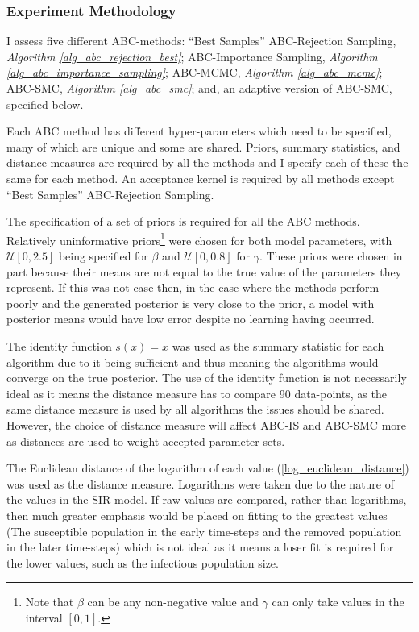 \documentclass[11pt,a4paper]{article}
\theoremstyle{break}
\begin{document}
\subsubsection*{Experiment Methodology}

  \par I assess five different ABC-methods: ``Best Samples'' ABC-Rejection Sampling, \textit{Algorithm \ref{alg_abc_rejection_best}}; ABC-Importance Sampling, \textit{Algorithm \ref{alg_abc_importance_sampling}}; ABC-MCMC, \textit{Algorithm \ref{alg_abc_mcmc}}; ABC-SMC, \textit{Algorithm \ref{alg_abc_smc}}; and, an adaptive version of ABC-SMC, specified below.

  \par Each ABC method has different hyper-parameters which need to be specified, many of which are unique and some are shared. Priors, summary statistics, and distance measures are required by all the methods and I specify each of these the same for each method. An acceptance kernel is required by all methods except ``Best Samples'' ABC-Rejection Sampling.

  \par The specification of a set of priors is required for all the ABC methods. Relatively uninformative priors\footnote{Note that $\beta$ can be any non-negative value and $\gamma$ can only take values in the interval $[0,1]$.} were chosen for both model parameters, with $\mathcal{U}[0,2.5]$ being specified for $\beta$ and $\mathcal{U}[0,0.8]$ for $\gamma$. These priors were chosen in part because their means are not equal to the true value of the parameters they represent. If this was not case then, in the case where the methods perform poorly and the generated posterior is very close to the prior, a model with posterior means would have low error despite no learning having occurred.

  \par The identity function $s(x)=x$ was used as the summary statistic for each algorithm due to it being sufficient and thus meaning the algorithms would converge on the true posterior. The use of the identity function is not necessarily ideal as it means the distance measure has to compare 90 data-points, as the same distance measure is used by all algorithms the issues should be shared. However, the choice of distance measure will affect ABC-IS and ABC-SMC more as distances are used to weight accepted parameter sets.

  \par The Euclidean distance of the logarithm of each value (\ref{log_euclidean_distance}) was used as the distance measure. Logarithms were taken due to the nature of the values in the SIR model. If raw values are compared, rather than logarithms, then much greater emphasis would be placed on fitting to the greatest values (The susceptible population in the early time-steps and the removed population in the later time-steps) which is not ideal as it means a loser fit is required for the lower values, such as the infectious population size.
\end{document}
